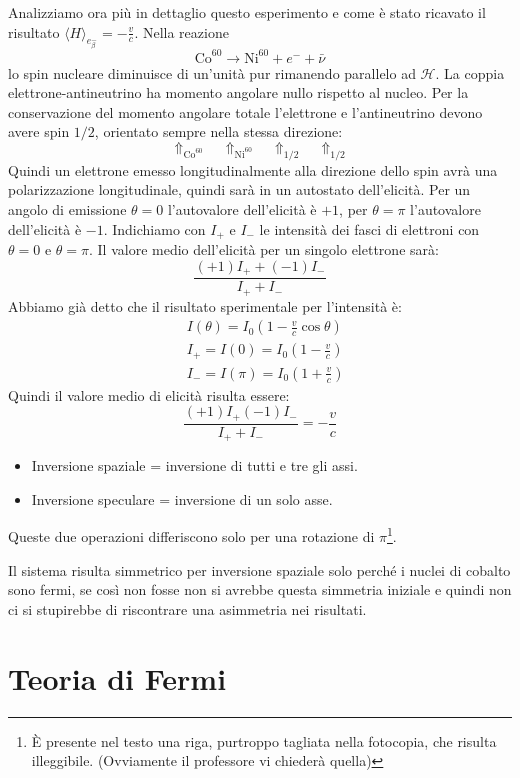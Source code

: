 Analizziamo ora più in dettaglio questo esperimento e come è stato ricavato il risultato $\langle H\rangle_{e_{\beta}^-}=-\frac{v}{c}$.
Nella reazione
\[
\text{Co}^{60}\rightarrow \text{Ni}^{60}+e^-+\bar{\nu}
\]
lo spin nucleare diminuisce di un'unità pur rimanendo parallelo ad $\mathcal{H}$. La coppia elettrone-antineutrino ha momento angolare nullo rispetto al nucleo.
Per la conservazione del momento angolare totale l'elettrone e l'antineutrino devono avere spin $1/2$, orientato sempre nella stessa direzione:
\[
\Uparrow_{\text{Co}^{60}}\quad\Uparrow_{\text{Ni}^{60}}\quad\Uparrow_{1/2}\quad\Uparrow_{1/2}
\]
Quindi un elettrone emesso longitudinalmente alla direzione dello spin avrà una polarizzazione longitudinale, quindi sarà in un autostato dell'elicità.
Per un angolo di emissione $\theta=0$ l'autovalore dell'elicità è $+1$, per $\theta=\pi$ l'autovalore dell'elicità è $-1$.
Indichiamo con $I_+$ e $I_-$ le intensità dei fasci di elettroni con $\theta=0$ e $\theta=\pi$. Il valore medio dell'elicità per un singolo elettrone sarà:
\[
\frac{(+1)I_++(-1)I_-}{I_++I_-}
\]
Abbiamo già detto che il risultato sperimentale per l'intensità è:
\begin{align*}
&I(\theta)=I_0(1-\frac{v}{c}\cos\theta)\\
&I_+=I(0)=I_0(1-\frac{v}{c})\\
&I_-=I(\pi)=I_0(1+\frac{v}{c})
\end{align*}
Quindi il valore medio di elicità risulta essere:
\[
\frac{(+1)I_+(-1)I_-}{I_++I_-}=-\frac{v}{c}
\]
\begin{itemize}
 \item Inversione spaziale = inversione di tutti e tre gli assi.
 \item Inversione speculare = inversione di un solo asse.
\end{itemize}
Queste due operazioni differiscono solo per una rotazione di $\pi$\footnote{\`E
presente nel testo una riga, purtroppo tagliata nella fotocopia, che risulta
illeggibile. (Ovviamente il professore vi chiederà quella)}.

Il sistema risulta simmetrico per inversione spaziale solo perché i nuclei di cobalto sono fermi, se così non fosse non si avrebbe questa simmetria iniziale e quindi non
ci si stupirebbe di riscontrare una asimmetria nei risultati.
\chapter{Teoria di Fermi}

